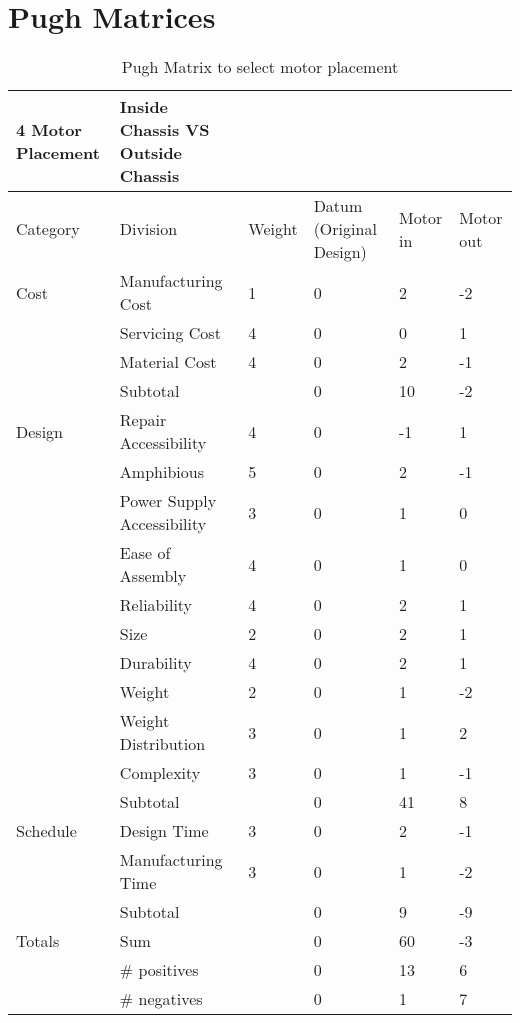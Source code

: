 \section{Pugh Matrices}

\begin{table}
\centering
\caption{Pugh Matrix to select motor placement}
\begin{tabular}{| llllll |} \hline
4 Motor Placement & Inside Chassis VS Outside Chassis &  &  &  &  & \\ \hline
Category & Division & Weight & Datum (Original Design) & Motor in  & Motor out & \\
Cost & Manufacturing Cost & 1 & 0 & 2 & -2 & \\
 & Servicing Cost & 4 & 0 & 0 & 1 & \\
 & Material Cost & 4 & 0 & 2 & -1 & \\
 & Subtotal &  & 0 & 10 & -2 & \\
Design & Repair Accessibility & 4 & 0 & -1 & 1 & \\
 & Amphibious  & 5 & 0 & 2 & -1 & \\
 & Power Supply Accessibility & 3 & 0 & 1 & 0 & \\
 & Ease of Assembly & 4 & 0 & 1 & 0 & \\
 & Reliability & 4 & 0 & 2 & 1 & \\
 & Size & 2 & 0 & 2 & 1 & \\
 & Durability & 4 & 0 & 2 & 1 & \\
 & Weight  & 2 & 0 & 1 & -2 & \\
 & Weight Distribution & 3 & 0 & 1 & 2 & \\
 & Complexity & 3 & 0 & 1 & -1 & \\
 & Subtotal &  & 0 & 41 & 8 & \\
Schedule & Design Time & 3 & 0 & 2 & -1 & \\
 & Manufacturing Time & 3 & 0 & 1 & -2 & \\
 & Subtotal &  & 0 & 9 & -9 & \\
Totals & Sum &  & 0 & 60 & -3 & \\
 & \# positives &  & 0 & 13 & 6 & \\
 & \# negatives &  & 0 & 1 & 7 & \\
 \end{tabular}
 \label{tab:pugh_motor}
 \end{table}
 
